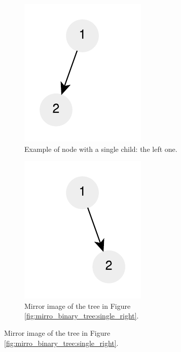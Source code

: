 \begin{figure}
	 \hfill
	 \begin{subfigure}[b]{0.4\textwidth}
		\includegraphics[]{sources/mirror_binary_tree/images/tree_only_right_child_mirror}
		\caption{Example of node with a single child: the left one.}
		\label{fig:mirro_binary_tree:single_left}
	 \end{subfigure}
	 \hfill
	 \begin{subfigure}[b]{0.4\textwidth}
		\includegraphics[]{sources/mirror_binary_tree/images/tree_only_right_child}
		\caption{Mirror image of the tree in Figure \ref{fig:mirro_binary_tree:single_right}.}
		\label{fig:mirro_binary_tree:single_left_mirror}
	 \end{subfigure}
	
	 \hfill


\end{figure}
